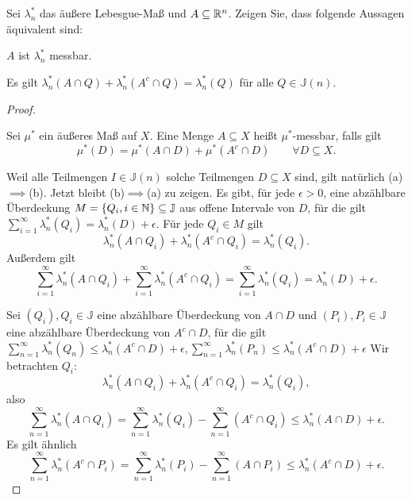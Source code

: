 \begin{Problem}
	Sei $\lambda^*_n$ das äußere Lebesgue-Maß und $A \subseteq \mathbb{R}^n$. Zeigen Sie, dass folgende Aussagen äquivalent sind:
	\begin{parts}
		\item $A$ ist $\lambda_n^*$ messbar.
		\item Es gilt $\lambda_n^*\left( A\cap Q \right) +\lambda_n^*\left( A^c\cap Q \right) =\lambda_n^*(Q)$ f\"{u}r alle $Q\in \mathbb{J}(n)$.
	\end{parts}
\end{Problem}
\begin{proof}
	\begin{Definition}
	Sei $\mu^*$ ein äußeres Maß auf $X$. Eine Menge $A\subseteq X$ heißt $\mu^*$-messbar, falls gilt
	\[
		\mu^*(D)=\mu^*(A\cap D)+\mu^*(A^c\cap D)\qquad \forall D\subseteq X
	.\] 
	\end{Definition}
	Weil alle Teilmengen $I\in \mathbb{J}(n)$ solche Teilmengen $D\subseteq X$ sind, gilt natürlich (a)$\implies$(b). Jetzt bleibt (b)$\implies$(a) zu zeigen. Es gibt, f\"{u}r jede $\epsilon>0$, eine abzählbare Überdeckung $M=\left\{ Q_i, i\in \mathbb{N} \right\} \subseteq \mathbb{J}$ aus offene Intervale von $D$, f\"{u}r die gilt $\sum_{i=1}^{\infty} \lambda_n^*(Q_i)=\lambda_n^*(D)+\epsilon$. F\"{u}r jede $Q_i\in M$ gilt
	\[
		\lambda_n^*\left( A\cap Q_i \right) +\lambda_n^*\left( A^c\cap Q_i \right) =\lambda_n^*(Q_i)
	.\] 
	Außerdem gilt
	\[
	\sum_{i=1}^{\infty} \lambda_n^*\left( A\cap Q_i \right) +\sum_{i=1}^{\infty} \lambda_n^*\left( A^c\cap Q_i \right) =\sum_{i=1}^{\infty} \lambda_n^*(Q_i)=\lambda_n^*(D)+\epsilon
	.\] 
	
	\vspace{1cm}

	Sei $(Q_i),Q_i\in \mathbb{J}$ eine abzählbare Überdeckung von $A \cap D$ und  $(P_i), P_i\in \mathbb{J}$ eine abzählbare Überdeckung von $A^c \cap D$, f\"{u}r die gilt $\sum_{n=1}^{\infty} \lambda_n^*(Q_n)\le\lambda_n^*(A^c\cap D)+\epsilon, \sum_{n=1}^{\infty} \lambda_n^*(P_n)\le\lambda_n^*(A^c\cap D)+\epsilon$ Wir betrachten $Q_i$:
	\[
		\lambda_n^*(A \cap Q_i)+\lambda_n^*(A^c \cap Q_i)=\lambda_n^*(Q_i)
	,\] 
	also
	\[
		\sum_{n=1}^{\infty} \lambda_n^*\left( A\cap Q_i \right) =\sum_{n=1}^{\infty} \lambda_n^*(Q_i)-\sum_{n=1}^{\infty} \left( A^c\cap Q_i \right)\le \lambda_n^*(A\cap D)+\epsilon 
	.\] 
	Es gilt ähnlich
	\[
	\sum_{n=1}^{\infty} \lambda_n^*\left( A^c\cap P_i \right) =\sum_{n=1}^{\infty} \lambda_n^*(P_i)-\sum_{n=1}^{\infty} (A\cap P_i)\le \lambda_n^*(A^c\cap D)+\epsilon
	.\] 
\end{proof}

